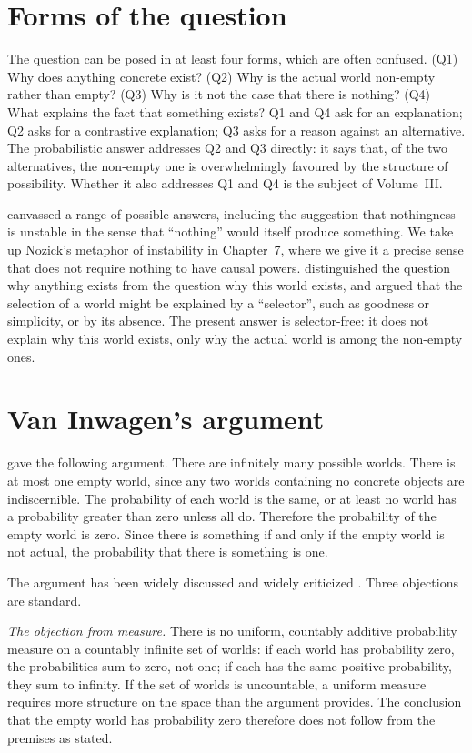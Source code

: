 \documentclass{situationist-preprint}
\begin{document}
\section{Forms of the question}

The question can be posed in at least four forms, which are often confused. (Q1) Why does anything concrete exist? (Q2) Why is the actual world non-empty rather than empty? (Q3) Why is it not the case that there is nothing? (Q4) What explains the fact that something exists? Q1 and Q4 ask for an explanation; Q2 asks for a contrastive explanation; Q3 asks for a reason against an alternative. The probabilistic answer addresses Q2 and Q3 directly: it says that, of the two alternatives, the non-empty one is overwhelmingly favoured by the structure of possibility. Whether it also addresses Q1 and Q4 is the subject of Volume~III.

\citet{Nozick1981} canvassed a range of possible answers, including the suggestion that nothingness is unstable in the sense that \enquote{nothing} would itself produce something. We take up Nozick's metaphor of instability in Chapter~7, where we give it a precise sense that does not require nothing to have causal powers. \citet{Parfit1998} distinguished the question why anything exists from the question why this world exists, and argued that the selection of a world might be explained by a \enquote{selector}, such as goodness or simplicity, or by its absence. The present answer is selector-free: it does not explain why this world exists, only why the actual world is among the non-empty ones.

\section{Van Inwagen's argument}

\citet{vanInwagen1996} gave the following argument. There are infinitely many possible worlds. There is at most one empty world, since any two worlds containing no concrete objects are indiscernible. The probability of each world is the same, or at least no world has a probability greater than zero unless all do. Therefore the probability of the empty world is zero. Since there is something if and only if the empty world is not actual, the probability that there is something is one.

The argument has been widely discussed and widely criticized \citep{Lowe1996,Grunbaum2004,Rundle2004}. Three objections are standard.

\emph{The objection from measure.} There is no uniform, countably additive probability measure on a countably infinite set of worlds: if each world has probability zero, the probabilities sum to zero, not one; if each has the same positive probability, they sum to infinity. If the set of worlds is uncountable, a uniform measure requires more structure on the space than the argument provides. The conclusion that the empty world has probability zero therefore does not follow from the premises as stated.
\end{document}
